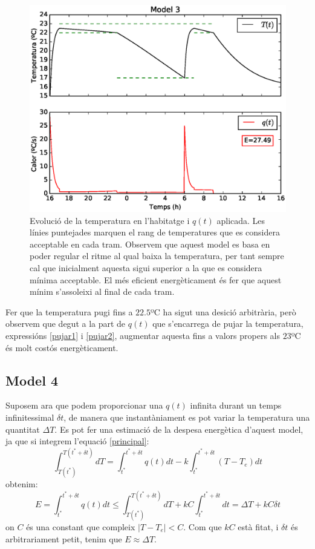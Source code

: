 \documentclass[11pt]{article}
\begin{document}
\begin{figure}[h!]
	\centering
	\includegraphics[width=12cm]{model3.eps}
	\caption{Evolució de la temperatura en l'habitatge i $q(t)$ aplicada. Les línies puntejades marquen el rang de temperatures que es considera acceptable en cada tram. Observem que aquest model es basa en poder regular el ritme al qual baixa la temperatura, per tant sempre cal que inicialment aquesta sigui superior a la que es considera mínima acceptable. El més eficient energèticament és fer que aquest mínim s'assoleixi al final de cada tram.}
	\label{figmodel3}
\end{figure}

Fer que la temperatura pugi fins a $22.5$ºC ha sigut una desició arbitrària, però observem que degut a la part de $q(t)$ que s'encarrega de pujar la temperatura, expressións \eqref{pujar1} i \eqref{pujar2}, augmentar aquesta fins a valors propers als $23$ºC és molt costós energèticament. 
\subsection*{Model 4}
Suposem ara que podem proporcionar una $q(t)$ infinita durant un temps infinitessimal $\delta t$, de manera que instantàniament es pot variar la temperatura una quantitat $\Delta T$. Es pot fer una estimació de la despesa energètica d'aquest model, ja que si integrem l'equació \eqref{principal}:
\begin{equation}
	\int_{T(t^*)}^{T(t^*+\delta t)}dT=\int_{t^*}^{t^*+\delta t}q(t)dt-k\int_{t^*}^{t^*+\delta t}(T-T_e)dt
\end{equation}
obtenim:
\begin{equation}
	E=\int_{t^*}^{t^*+\delta t}q(t)dt\leq \int_{T(t^*)}^{T(t^*+\delta t)}dT+kC\int_{t^*}^{t^*+\delta t}dt=\Delta T+kC\delta t
\end{equation}
on $C$ és una constant que compleix $|T-T_e|<C$. Com que $kC$ està fitat, i $\delta t$ és arbitrariament petit, tenim que $E\approx\Delta T$.  
\end{document}
